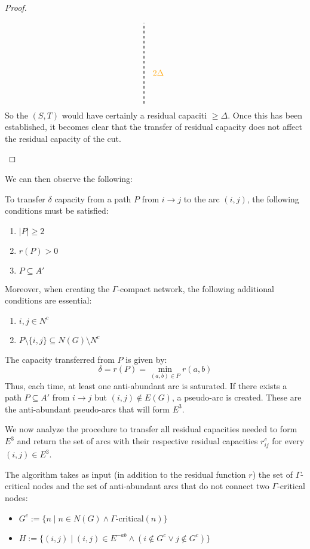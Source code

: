 \begin{proof}
\begin{enumerate}
\[\begin{tikzpicture}[node distance={15mm}, thick , main/.style = {draw, circle}]
                    \draw[dashed] (1.8,-1.7) -- (1.8,1.7);
                    \node at (2.4, -.4) {\text{\color{darktangerine}{$2\Delta$}}};
                \end{tikzpicture}\]
                So the $(S,T)$ would have certainly a residual capaciti $\ge \Delta$.
                Once this has been established, it becomes clear that the transfer of residual capacity does not affect the residual capacity of the cut.
        \end{enumerate}
    \end{proof}
    We can then observe the following:

    \begin{definition}
    
    To transfer $\delta$ capacity from a path \( P \) from \( i \rightarrow j \) to the arc \( (i,j) \), the following conditions must be satisfied:
    \begin{enumerate}
        \item \( |P| \ge 2 \)
        \item \( r(P) > 0 \)
        \item \( P \subseteq A' \)
    \end{enumerate}
    
    Moreover, when creating the \(\Gamma\)-compact network, the following additional conditions are essential:
    \begin{enumerate}
        \item \( i,j \in N^c \)
        \item \( P \setminus \{i,j\} \subseteq N(G) \setminus N^c \)
    \end{enumerate}
    
    \end{definition}
    
    The capacity transferred from \( P \) is given by:
    \[
    \delta = r(P) = \min_{(a,b) \in P} r(a,b)
    \]
    Thus, each time, at least one anti-abundant arc is saturated. If there exists a path \( P \subseteq A' \) from \( i \rightarrow j \) but \( (i,j) \notin E(G) \), a pseudo-arc is created. These are the anti-abundant pseudo-arcs that will form \( E^3 \).
    
    We now analyze the procedure to transfer all residual capacities needed to form \( E^3 \) and return the set of arcs with their respective residual capacities \( r^c_{ij} \) for every \( (i,j) \in E^3 \).
    
    The algorithm takes as input (in addition to the residual function \( r \)) the set of \(\Gamma\)-critical nodes and the set of anti-abundant arcs that do not connect two \(\Gamma\)-critical nodes:
    \begin{itemize}
        \item \( G^c := \{n \mid n \in N(G) \land \Gamma\text{-critical}(n)\} \)
        \item \( H := \{(i,j) \mid (i,j) \in E^{-ab} \land (i \notin G^c \lor j \notin G^c)\} \)
    \end{itemize}
    
